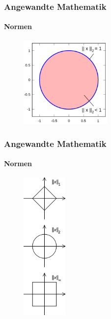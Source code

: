 \documentclass{beamer}
\begin{document}
\begin{frame}
    \frametitle{Angewandte Mathematik}
\framesubtitle{Normen}

\begin{figure}[H]
      \centering
    \includegraphics[width=0.4\textwidth]{images/Unit_disc_2}
\end{figure}
 \end{frame}



\begin{frame}
    \frametitle{Angewandte Mathematik}
\framesubtitle{Normen}

\begin{figure}[H]
      \centering
    \includegraphics[width=0.2\textwidth]{images/Vector_norms}
\end{figure}

 \end{frame}
\end{document}
